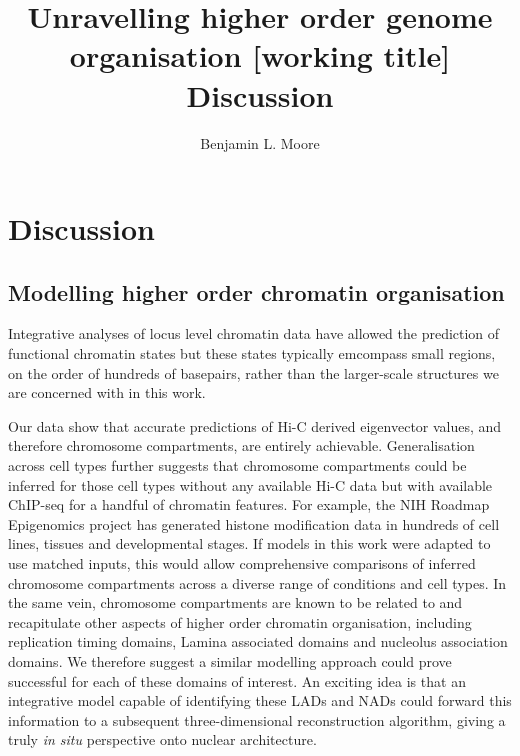 \documentclass[a4paper,11pt,oneside]{book}
\title{ \vspace{3in} Unravelling higher order genome organisation {\small [working
    title]} \\ \vspace{2em} {\large {\bf Discussion}} }
\author{Benjamin L. Moore}
\begin{document}

\chapter{Discussion}

%
%

\section{Modelling higher order chromatin organisation}

Integrative analyses of locus level chromatin data have allowed the
prediction of functional chromatin states \cite{Ernst2012, Ram2011,
  Dunham2012, Hoffman2013} but these states typically emcompass small
regions, on the order of hundreds of basepairs, rather than the larger-scale structures we are concerned with in this work.

Our data show that accurate predictions of Hi-C derived
eigenvector values, and therefore chromosome compartments, are entirely achievable. Generalisation across cell types further suggests that chromosome compartments could be inferred for those cell types without any available Hi-C data but with available ChIP-seq for a handful of chromatin features. For example, the NIH Roadmap Epigenomics project has generated histone modification data in hundreds of cell lines, tissues and developmental stages.\cite{Bernstein2010, Kundaje2015} If models in this work were adapted to use matched inputs, this would allow comprehensive comparisons of inferred chromosome compartments across a diverse range of conditions and cell types. In the same vein, chromosome compartments are known to be related to and recapitulate other aspects of higher order chromatin organisation, including replication timing domains, Lamina associated domains and nucleolus association domains. We therefore suggest a similar modelling approach could prove successful for each of these domains of interest. An exciting idea is that an integrative model capable of identifying these LADs and NADs could forward this information to a subsequent three-dimensional reconstruction algorithm, giving a truly \emph{in situ} perspective onto nuclear architecture.
\end{document}
